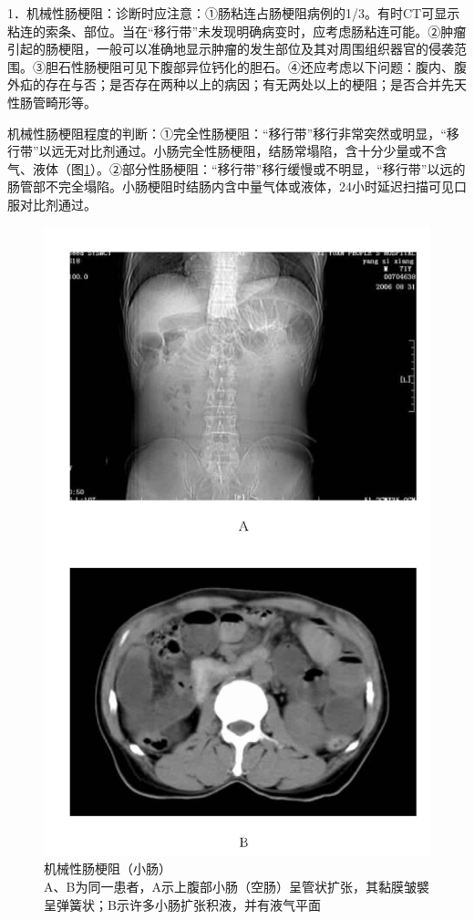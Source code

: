 1．机械性肠梗阻：诊断时应注意：①肠粘连占肠梗阻病例的1/3。有时CT可显示粘连的索条、部位。当在“移行带”未发现明确病变时，应考虑肠粘连可能。②肿瘤引起的肠梗阻，一般可以准确地显示肿瘤的发生部位及其对周围组织器官的侵袭范围。③胆石性肠梗阻可见下腹部异位钙化的胆石。④还应考虑以下问题：腹内、腹外疝的存在与否；是否存在两种以上的病因；有无两处以上的梗阻；是否合并先天性肠管畸形等。

机械性肠梗阻程度的判断：①完全性肠梗阻：“移行带”移行非常突然或明显，“移行带”以远无对比剂通过。小肠完全性肠梗阻，结肠常塌陷，含十分少量或不含气、液体（图\ref{fig17-16}）。②部分性肠梗阻：“移行带”移行缓慢或不明显，“移行带”以远的肠管部不完全塌陷。小肠梗阻时结肠内含中量气体或液体，24小时延迟扫描可见口服对比剂通过。

\begin{figure}[!htbp]
 \centering
 \includegraphics[width=.7\textwidth,height=\textheight,keepaspectratio]{./images/Image00368.jpg}
 \captionsetup{justification=centering}
 \caption{机械性肠梗阻（小肠）\\{\small A、B为同一患者，A示上腹部小肠（空肠）呈管状扩张，其黏膜皱襞呈弹簧状；B示许多小肠扩张积液，并有液气平面}}
 \label{fig17-16}
  \end{figure} 

